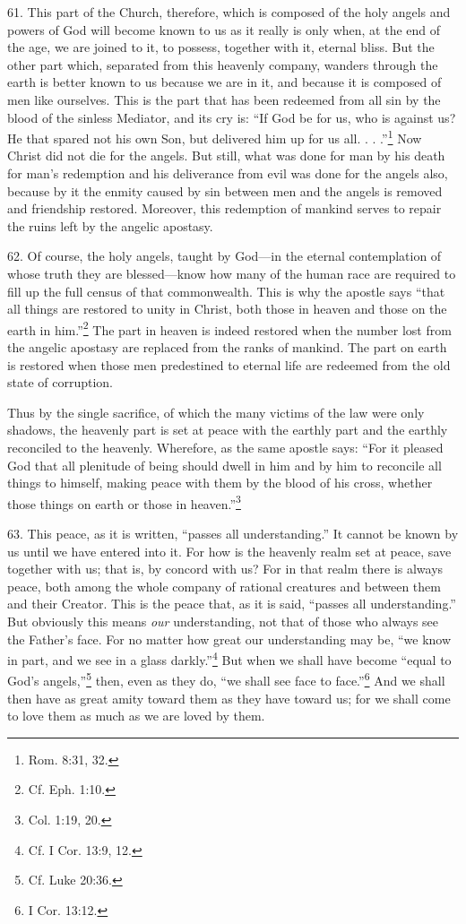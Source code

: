 61. This part of the Church, therefore, which is composed of the holy angels and powers of God will become known to us as it really is only when, at the end of the age, we are joined to it, to possess, together with it, eternal bliss. But the other part which, separated from this heavenly company, wanders through the earth is better known to us because we are in it, and because it is composed of men like ourselves. This is the part that has been redeemed from all sin by the blood of the sinless Mediator, and its cry is: ``If God be for us, who is against us? He that spared not his own Son, but delivered him up for us all. . . .''\footnote{Rom. 8:31, 32.} Now Christ did not die for the angels. But still, what was done for man by his death for man's redemption and his deliverance from evil was done for the angels also, because by it the enmity caused by sin between men and the angels is removed and friendship restored. Moreover, this redemption of mankind serves to repair the ruins left by the angelic apostasy.

62. Of course, the holy angels, taught by God—in the eternal contemplation of whose truth they are blessed—know how many of the human race are required to fill up the full census of that commonwealth. This is why the apostle says ``that all things are restored to unity in Christ, both those in heaven and those on the earth in him.''\footnote{Cf. Eph. 1:10.} The part in heaven is indeed restored when the number lost from the angelic apostasy are replaced from the ranks of mankind. The part on earth is restored when those men predestined to eternal life are redeemed from the old state of corruption.

Thus by the single sacrifice, of which the many victims of the law were only shadows, the heavenly part is set at peace with the earthly part and the earthly reconciled to the heavenly. Wherefore, as the same apostle says: ``For it pleased God that all plenitude of being should dwell in him and by him to reconcile all things to himself, making peace with them by the blood of his cross, whether those things on earth or those in heaven.''\footnote{Col. 1:19, 20.}

63. This peace, as it is written, ``passes all understanding.'' It cannot be known by us until we have entered into it. For how is the heavenly realm set at peace, save together with us; that is, by concord with us? For in that realm there is always peace, both among the whole company of rational creatures and between them and their Creator. This is the peace that, as it is said, ``passes all understanding.'' But obviously this means \emph{our} understanding, not that of those who always see the Father's face. For no matter how great our understanding may be, ``we know in part, and we see in a glass darkly.''\footnote{Cf. I Cor. 13:9, 12.} But when we shall have become ``equal to God's angels,''\footnote{Cf. Luke 20:36.} then, even as they do, ``we shall see face to face.''\footnote{I Cor. 13:12.} And we shall then have as great amity toward them as they have toward us; for we shall come to love them as much as we are loved by them.


